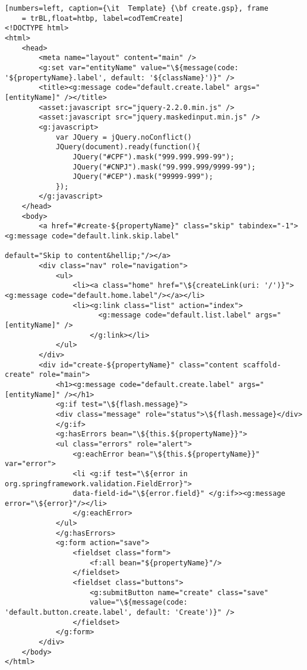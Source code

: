 \begin{lstlisting}[numbers=left, caption={\it  Template} {\bf create.gsp}, frame
    = trBL,float=htbp, label=codTemCreate]
<!DOCTYPE html>
<html>
    <head>
        <meta name="layout" content="main" />
        <g:set var="entityName" value="\${message(code: '${propertyName}.label', default: '${className}')}" />
        <title><g:message code="default.create.label" args="[entityName]" /></title>
        <asset:javascript src="jquery-2.2.0.min.js" />
        <asset:javascript src="jquery.maskedinput.min.js" />
        <g:javascript>
            var JQuery = jQuery.noConflict()
            JQuery(document).ready(function(){
                JQuery("#CPF").mask("999.999.999-99");
                JQuery("#CNPJ").mask("99.999.999/9999-99");
                JQuery("#CEP").mask("99999-999");
            });
        </g:javascript>
    </head>
    <body>
        <a href="#create-${propertyName}" class="skip" tabindex="-1"><g:message code="default.link.skip.label" 
                                                                      default="Skip to content&hellip;"/></a>
        <div class="nav" role="navigation">
            <ul>
                <li><a class="home" href="\${createLink(uri: '/')}"><g:message code="default.home.label"/></a></li>
                <li><g:link class="list" action="index">
                      <g:message code="default.list.label" args="[entityName]" />
                    </g:link></li>
            </ul>
        </div>
        <div id="create-${propertyName}" class="content scaffold-create" role="main">
            <h1><g:message code="default.create.label" args="[entityName]" /></h1>
            <g:if test="\${flash.message}">
            <div class="message" role="status">\${flash.message}</div>
            </g:if>
            <g:hasErrors bean="\${this.${propertyName}}">
            <ul class="errors" role="alert">
                <g:eachError bean="\${this.${propertyName}}" var="error">
                <li <g:if test="\${error in org.springframework.validation.FieldError}">
                data-field-id="\${error.field}" </g:if>><g:message error="\${error}"/></li>
                </g:eachError>
            </ul>
            </g:hasErrors>
            <g:form action="save">
                <fieldset class="form">
                    <f:all bean="${propertyName}"/>
                </fieldset>
                <fieldset class="buttons">
                    <g:submitButton name="create" class="save" 
                    value="\${message(code: 'default.button.create.label', default: 'Create')}" />
                </fieldset>
            </g:form>
        </div>
    </body>
</html> 
\end{lstlisting}

